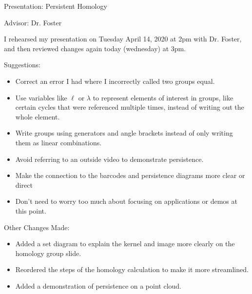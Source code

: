 \documentclass{exam}
\begin{document}
Presentation: Persistent Homology

Advisor: Dr. Foster

\bigskip

I rehearsed my presentation on Tuesday April 14, 2020 at 2pm with Dr. Foster, and then reviewed changes again today (wednesday) at 3pm.

\bigskip

Suggestions:
\begin{itemize}
    \item Correct an error I had where I incorrectly called two groups equal.
    \item Use variables like \(\ell\) or \(\lambda\) to represent elements of interest in groups, like certain cycles that were referenced multiple times, instead of writing out the whole element.
    \item Write groups using generators and angle brackets instead of only writing them as linear combinations.
    \item Avoid referring to an outside video to demonstrate persistence.
    \item Make the connection to the barcodes and persistence diagrams more clear or direct
    \item Don't need to worry too much about focusing on applications or demos at this point.
\end{itemize}

Other Changes Made:
\begin{itemize}
    \item Added a set diagram to explain the kernel and image more clearly on the homology group slide.
    \item Reordered the steps of the homology calculation to make it more streamlined.
    \item Added a demonstration of persistence on a point cloud.
\end{itemize}
\end{document}
